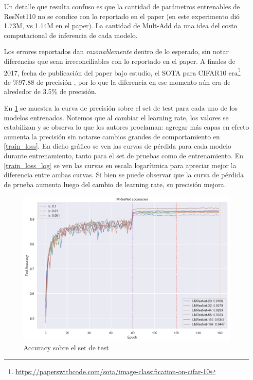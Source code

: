 \documentclass[titlepage,a4paper,oneside]{article}
\begin{document}
Un detalle que resulta confuso es que la cantidad de parámetros entrenables de ResNet110 no se condice con lo reportado en el paper (en este experimento dió 1.73M, vs 1.14M en el paper). La cantidad de Mult-Add da una idea del costo computacional de inferencia de cada modelo.

Los errores reportados dan \textit{razonablemente} dentro de lo esperado, sin notar diferencias que sean irreconciliables con lo reportado en el paper. A finales de 2017, fecha de publicación del paper bajo estudio, el SOTA para CIFAR10 era\footnote{\url{https://paperswithcode.com/sota/image-classification-on-cifar-10}} de \%97.88 de precisión \cite{hu2019squeezeandexcitation}, por lo que la diferencia en ese momento aún era de alrededor de 3.5\% de precisión.

En \ref{test_set_acc} se muestra la curva de precisión sobre el set de test para cada uno de los modelos entrenados. Notemos que al cambiar el learning rate, los valores se estabilizan y se observa lo que los autores proclaman: agregar más capas en efecto aumenta la precisión sin notarse cambios grandes de comportamiento en \ref{train_loss}. En dicho gráfico se ven las curvas de pérdida para cada modelo durante entrenamiento, tanto para el set de pruebas como de entrenamiento. En \ref{train_loss_log} se ven las curvas en escala logarítmica para apreciar mejor la diferencia entre ambas curvas. Si bien se puede observar que la curva de pérdida de prueba aumenta luego del cambio de learning rate, su precisión mejora.

\begin{figure}[H]
\centering
\includegraphics[width=\textwidth]{images/accuracy.png}
\caption{Accuracy sobre el set de test}
\label{test_set_acc}
\end{figure}
\end{document}
